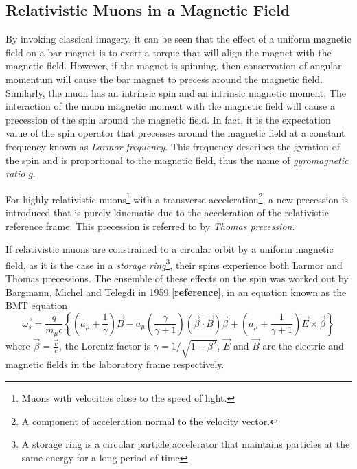 \documentclass{outhesis}
\begin{document}
\subsection{Relativistic Muons in a Magnetic Field}

By invoking classical imagery, it can be seen that the effect of a uniform magnetic field on a bar magnet is to exert a torque that will align the magnet with the magnetic field. However, if the magnet is spinning, then conservation of angular momentum will cause the bar magnet to precess around the magnetic field. Similarly, the muon has an intrinsic spin and an intrinsic magnetic moment. The interaction of the muon magnetic moment with the magnetic field will cause a precession of the spin around the magnetic field. In fact, it is the expectation value of the spin operator
that precesses around the magnetic field at a constant frequency known as \emph{Larmor frequency}. 
This frequency describes the gyration of the spin and is proportional to the magnetic field, thus the name of \emph{gyromagnetic ratio} $g$. 


For highly relativistic muons\footnote{Muons with velocities close to the speed of light.} with a transverse acceleration\footnote{A component of acceleration normal to the velocity vector.}, a new precession is introduced that is purely kinematic due to the acceleration of the relativistic reference frame. This precession is referred to by \emph{Thomas precession}.

If relativistic muons are constrained to a circular orbit by a uniform magnetic field, as it is the case in a \emph{storage ring}\footnote{A storage ring is a circular particle accelerator that maintains particles at the same energy for a long period of time}, their spins experience both Larmor and Thomas precessions. The ensemble of these effects on the spin was worked out by Bargmann, Michel and Telegdi in 1959 [\textbf{reference}], in an equation known as the BMT equation 
\begin{equation}
\overrightarrow{\omega_s} =  \frac{q}{m_{\mu}c}\left\{\left(a_{\mu} + \frac{1}{\gamma}\right)\overrightarrow{B}    -   a_{\mu}\left(\frac{\gamma}{\gamma + 1}\right)\left(\overrightarrow{\beta} \cdot \overrightarrow{B}\right)\overrightarrow{\beta}   +   \left(a_{\mu}+\frac{1}{\gamma + 1}\right)\overrightarrow{E} \times\overrightarrow{\beta}                 \right\}
\end{equation}
where $\overrightarrow{\beta} = \frac{\overrightarrow{v} }{c}$, the Lorentz factor is $\gamma = 1/\sqrt{1-\beta^2}$, $\overrightarrow{E}$ and $\overrightarrow{B} $ are the electric and magnetic fields in the laboratory frame respectively.
\end{document}
